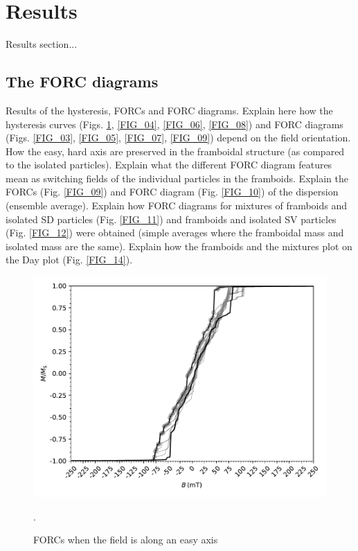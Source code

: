 \section{Results}
Results section...\par

\subsection{The FORC diagrams}
Results of the hysteresis, FORCs and FORC diagrams. Explain here how the hysteresis curves (Figs. \ref{FIG_02}, \ref{FIG_04}, \ref{FIG_06}, \ref{FIG_08}) and FORC diagrams (Figs. \ref{FIG_03}, \ref{FIG_05}, \ref{FIG_07}, \ref{FIG_09}) depend on the field orientation. How the easy, hard axis are preserved in the framboidal structure (as compared to the isolated particles). Explain what the different FORC diagram features mean as switching fields of the individual particles in the framboids. Explain the FORCs (Fig. \ref{FIG_09}) and FORC diagram (Fig. \ref{FIG_10}) of the dispersion (ensemble average). Explain how FORC diagrams for mixtures of framboids and isolated SD particles (Fig. \ref{FIG_11}) and framboids and isolated SV particles (Fig. \ref{FIG_12}) were obtained (simple averages where the framboidal mass and isolated mass are the same). Explain how the framboids and the mixtures plot on the Day plot (Fig. \ref{FIG_14}).\par
\begin{figure}
\centering
\includegraphics[width=\textwidth]{research-4/figs/BM21_withFORCS.pdf}
\caption[FORCs when the field is along an easy axis]{FORCs when the field is along an easy axis}.
\label{FIG_02}
\end{figure}

